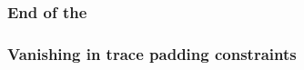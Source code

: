 \subsubsection{End of the \romColumnCfi{}}                                                      \label{rom: generalities: end of cfi}                       
\subsubsection{Vanishing in trace padding constraints}                                          \label{rom: generalities: vanishing in trace padding}       

